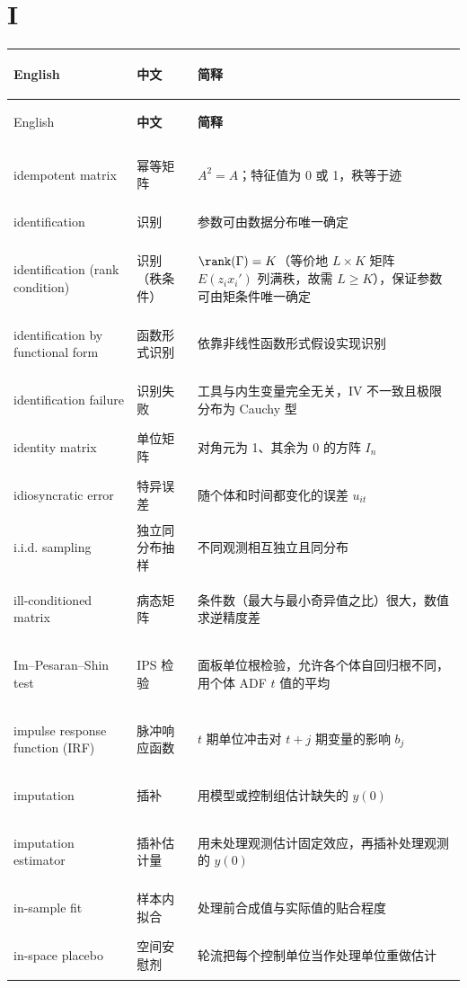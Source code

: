 \section*{I}
\begin{longtable}{@{}>{\bfseries\boldmath\raggedright\arraybackslash}p{4.6cm}>{\raggedright\arraybackslash}p{3.2cm}>{\raggedright\arraybackslash}p{\dimexpr\textwidth-7.8cm-4\tabcolsep\relax}@{}}
\toprule
English & \textbf{中文} & \textbf{简释}\\
\midrule
\endfirsthead
\toprule
English & \textbf{中文} & \textbf{简释}\\
\midrule
\endhead
\midrule
\multicolumn{3}{r@{}}{\footnotesize\itshape （续下页）}\\
\endfoot
\bottomrule
\endlastfoot
idempotent matrix & 幂等矩阵 & $A^2=A$；特征值为 0 或 1，秩等于迹 \\
identification & 识别 & 参数可由数据分布唯一确定 \\
identification (rank condition) & 识别（秩条件） & $\rank(\Gamma)=K$（等价地 $L\times K$ 矩阵 $E(z_ix_i')$ 列满秩，故需 $L\ge K$），保证参数可由矩条件唯一确定 \\
identification by functional form & 函数形式识别 & 依靠非线性函数形式假设实现识别 \\
identification failure & 识别失败 & 工具与内生变量完全无关，IV 不一致且极限分布为 Cauchy 型 \\
identity matrix & 单位矩阵 & 对角元为 1、其余为 0 的方阵 $I_n$ \\
idiosyncratic error & 特异误差 & 随个体和时间都变化的误差 $u_{it}$ \\
i.i.d. sampling & 独立同分布抽样 & 不同观测相互独立且同分布 \\
ill-conditioned matrix & 病态矩阵 & 条件数（最大与最小奇异值之比）很大，数值求逆精度差 \\
Im--Pesaran--Shin test & IPS 检验 & 面板单位根检验，允许各个体自回归根不同，用个体 ADF $t$ 值的平均 \\
impulse response function (IRF) & 脉冲响应函数 & $t$ 期单位冲击对 $t+j$ 期变量的影响 $b_j$ \\
imputation & 插补 & 用模型或控制组估计缺失的 $y(0)$ \\
imputation estimator & 插补估计量 & 用未处理观测估计固定效应，再插补处理观测的 $y(0)$ \\
in-sample fit & 样本内拟合 & 处理前合成值与实际值的贴合程度 \\
in-space placebo & 空间安慰剂 & 轮流把每个控制单位当作处理单位重做估计 \\

\end{longtable}
